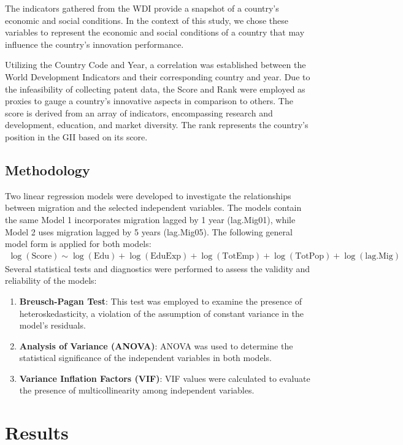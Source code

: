 \documentclass[12pt]{article}
\begin{document}
The indicators gathered from the WDI provide a snapshot of a country's economic and social conditions. In the context of this study, we chose these variables to represent the economic and social conditions of a country that may influence the country's innovation performance.

Utilizing the Country Code and Year, a correlation was established between the World Development Indicators and their corresponding country and year.
Due to the infeasibility of collecting patent data, the Score and Rank were employed as proxies to gauge a country's innovative aspects in comparison to others.
The score is derived from an array of indicators, encompassing research and development, education, and market diversity.
The rank represents the country's position in the GII based on its score.

\subsection{Methodology} \label{data-methodology}

Two linear regression models were developed to investigate the relationships between migration and the selected independent variables. The models contain the same Model 1 incorporates migration lagged by 1 year (lag.Mig01), while Model 2 uses migration lagged by 5 years (lag.Mig05). The following general model form is applied for both models:
\begin{align*}
\log(\text{Score}) \sim \log(\text{Edu}) + \log(\text{EduExp}) + \log(\text{TotEmp}) + \log(\text{TotPop}) + \log(\text{lag.Mig})
\end{align*}
Several statistical tests and diagnostics were performed to assess the validity and reliability of the models:
\begin{enumerate}
\item \textbf{Breusch-Pagan Test}: This test was employed to examine the presence of heteroskedasticity, a violation of the assumption of constant variance in the model's residuals.
\item \textbf{Analysis of Variance (ANOVA)}: ANOVA was used to determine the statistical significance of the independent variables in both models.
\item \textbf{Variance Inflation Factors (VIF)}: VIF values were calculated to evaluate the presence of multicollinearity among independent variables.
\end{enumerate}

\section{Results} \label{results}
\end{document}
